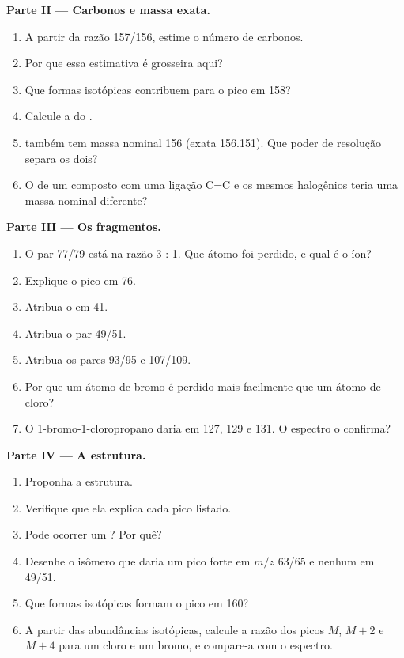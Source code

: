 \begin{problem}
\medskip
\noindent\textbf{Parte II --- Carbonos e massa exata.}
\begin{enumerate}[resume]
  \item A partir da razão 157/156, estime o número de carbonos.
  \item Por que essa estimativa é grosseira aqui?
  \item Que formas isotópicas contribuem para o pico em 158?
  \item Calcule a  do .
  \item {} também tem massa nominal 156 (exata 156.151). Que poder de resolução separa os
        dois?
  \item O  de um composto com uma ligação C=C e os mesmos halogênios teria uma massa
        nominal diferente?
\end{enumerate}

\medskip
\noindent\textbf{Parte III --- Os fragmentos.}
\begin{enumerate}[resume]
  \item O par 77/79 está na razão 3 : 1. Que átomo foi perdido, e qual é o íon?
  \item Explique o pico em 76.
  \item Atribua o  em 41.
  \item Atribua o par 49/51.
  \item Atribua os pares 93/95 e 107/109.
  \item Por que um átomo de bromo é perdido mais facilmente que um átomo de cloro?
  \item O 1-bromo-1-cloropropano daria  em 127, 129 e 131. O espectro
        o confirma?
\end{enumerate}

\medskip
\noindent\textbf{Parte IV --- A estrutura.}
\begin{enumerate}[resume]
  \item Proponha a estrutura.
  \item Verifique que ela explica cada pico listado.
  \item Pode ocorrer um ? Por quê?
  \item Desenhe o isômero que daria um pico forte em $m/z$ 63/65 e nenhum em 49/51.
  \item Que formas isotópicas formam o pico em 160?
  \item A partir das abundâncias isotópicas, calcule a razão dos picos $M$, $M+2$ e $M+4$ para um
        cloro e um bromo, e compare-a com o espectro.
\end{enumerate}
\end{problem}
